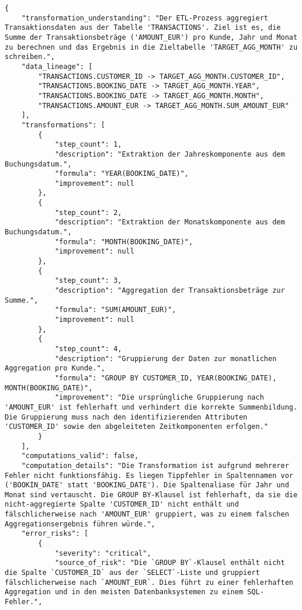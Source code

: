 \begin{lstlisting}[caption={Ausgabe: GEMINI 2.5 Pro Anwendungsfall 1 Robustheitsdurchlauf},label={gemini_case1_prompt3}]
{
    "transformation_understanding": "Der ETL-Prozess aggregiert Transaktionsdaten aus der Tabelle 'TRANSACTIONS'. Ziel ist es, die Summe der Transaktionsbeträge ('AMOUNT_EUR') pro Kunde, Jahr und Monat zu berechnen und das Ergebnis in die Zieltabelle 'TARGET_AGG_MONTH' zu schreiben.",
    "data_lineage": [
        "TRANSACTIONS.CUSTOMER_ID -> TARGET_AGG_MONTH.CUSTOMER_ID",
        "TRANSACTIONS.BOOKING_DATE -> TARGET_AGG_MONTH.YEAR",
        "TRANSACTIONS.BOOKING_DATE -> TARGET_AGG_MONTH.MONTH",
        "TRANSACTIONS.AMOUNT_EUR -> TARGET_AGG_MONTH.SUM_AMOUNT_EUR"
    ],
    "transformations": [
        {
            "step_count": 1,
            "description": "Extraktion der Jahreskomponente aus dem Buchungsdatum.",
            "formula": "YEAR(BOOKING_DATE)",
            "improvement": null
        },
        {
            "step_count": 2,
            "description": "Extraktion der Monatskomponente aus dem Buchungsdatum.",
            "formula": "MONTH(BOOKING_DATE)",
            "improvement": null
        },
        {
            "step_count": 3,
            "description": "Aggregation der Transaktionsbeträge zur Summe.",
            "formula": "SUM(AMOUNT_EUR)",
            "improvement": null
        },
        {
            "step_count": 4,
            "description": "Gruppierung der Daten zur monatlichen Aggregation pro Kunde.",
            "formula": "GROUP BY CUSTOMER_ID, YEAR(BOOKING_DATE), MONTH(BOOKING_DATE)",
            "improvement": "Die ursprüngliche Gruppierung nach 'AMOUNT_EUR' ist fehlerhaft und verhindert die korrekte Summenbildung. Die Gruppierung muss nach den identifizierenden Attributen 'CUSTOMER_ID' sowie den abgeleiteten Zeitkomponenten erfolgen."
        }
    ],
    "computations_valid": false,
    "computation_details": "Die Transformation ist aufgrund mehrerer Fehler nicht funktionsfähig. Es liegen Tippfehler in Spaltennamen vor ('BOOKIN_DATE' statt 'BOOKING_DATE'). Die Spaltenaliase für Jahr und Monat sind vertauscht. Die GROUP BY-Klausel ist fehlerhaft, da sie die nicht-aggregierte Spalte 'CUSTOMER_ID' nicht enthält und fälschlicherweise nach 'AMOUNT_EUR' gruppiert, was zu einem falschen Aggregationsergebnis führen würde.",
    "error_risks": [
        {
            "severity": "critical",
            "source_of_risk": "Die `GROUP BY`-Klausel enthält nicht die Spalte `CUSTOMER_ID` aus der `SELECT`-Liste und gruppiert fälschlicherweise nach `AMOUNT_EUR`. Dies führt zu einer fehlerhaften Aggregation und in den meisten Datenbanksystemen zu einem SQL-Fehler.",

\end{lstlisting}
